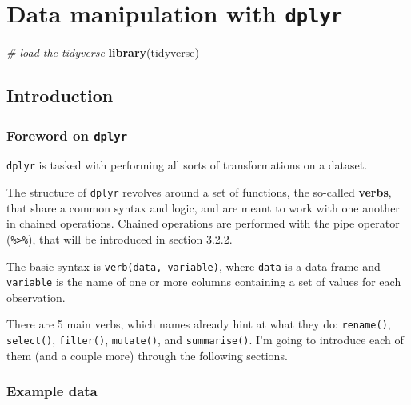 \documentclass[]{book}
\newenvironment{Shaded}{}{}
\newcommand{\CommentTok}[1]{\textcolor[rgb]{0.38,0.63,0.69}{\textit{#1}}}
\newcommand{\KeywordTok}[1]{\textcolor[rgb]{0.00,0.44,0.13}{\textbf{#1}}}
\newcommand{\NormalTok}[1]{#1}
\begin{document}
\hypertarget{data-manipulation-with-dplyr}{%
\chapter{\texorpdfstring{Data manipulation with \texttt{dplyr}}{Data manipulation with dplyr}}\label{data-manipulation-with-dplyr}}

\begin{Shaded}
\begin{Highlighting}[]
\CommentTok{# load the tidyverse}
\KeywordTok{library}\NormalTok{(tidyverse)}
\end{Highlighting}
\end{Shaded}

\hypertarget{introduction}{%
\section{Introduction}\label{introduction}}

\hypertarget{foreword-on-dplyr}{%
\subsection{\texorpdfstring{Foreword on \texttt{dplyr}}{Foreword on dplyr}}\label{foreword-on-dplyr}}

\texttt{dplyr} is tasked with performing all sorts of transformations on a dataset.

The structure of \texttt{dplyr} revolves around a set of functions, the so-called
\textbf{verbs}, that share a common syntax and logic, and are meant to work with one
another in chained operations. Chained operations are performed with the pipe
operator (\texttt{\%\textgreater{}\%}), that will be introduced in section 3.2.2.

The basic syntax is \texttt{verb(data,\ variable)}, where \texttt{data} is a data frame and
\texttt{variable} is the name of one or more columns containing a set of values for
each observation.

There are 5 main verbs, which names already hint at what they do: \texttt{rename()},
\texttt{select()}, \texttt{filter()}, \texttt{mutate()}, and \texttt{summarise()}.
I'm going to introduce each of them (and a couple more) through the following sections.

\hypertarget{example-data}{%
\subsection{Example data}\label{example-data}}
\end{document}

